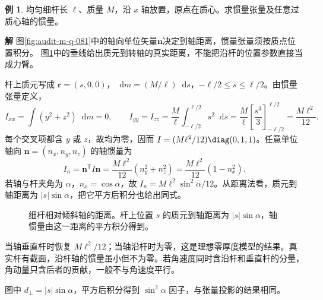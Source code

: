 \documentclass[11pt,openany,fontset=fandol]{ctexbook}
\theoremstyle{plain}\newtheorem{theorem}{定理}[chapter]\newtheorem{proposition}[theorem]{命题}
\theoremstyle{definition}\newtheorem{definition}{定义}[chapter]\newtheorem{example}{例}[chapter]
\theoremstyle{remark}\newtheorem*{remark}{说明}
\newcommand{\SolutionStart}{\par\nobreak\medskip\nobreak\noindent\textbf{解}\quad\ignorespaces}
\newenvironment{solution}{\SolutionStart}{\par\medskip}
\newcommand{\dd}{\mathop{}\!\mathrm d}\newcommand{\ii}{\mathrm i}\newcommand{\ee}{\mathrm e}
\newcommand{\vct}[1]{\bm{#1}}\newcommand{\Rea}{\operatorname{Re}}\newcommand{\Ima}{\operatorname{Im}}
\begin{document}
\begin{example}
均匀细杆长 $\ell$、质量 $M$，沿 $x$ 轴放置，原点在质心。求惯量张量及任意过质心轴的惯量。
\end{example}

\begin{solution}
图\ref{fig:audit-m-q-081}中的轴向单位矢量$\vct n$决定到轴距离，惯量张量须按质点位置积分。
图\ref{fig:orig-068}中的垂线给出质元到转轴的真实距离，不能把沿杆的位置参数直接当成力臂。

杆上质元写成 $\vct r=(s,0,0)$，$\dd m=(M/\ell)\dd s$，$-\ell/2\le s\le\ell/2$。由惯量张量定义，
\[
I_{xx}=\int(y^2+z^2)\dd m=0,\qquad
I_{yy}=I_{zz}=\frac M\ell\int_{-\ell/2}^{\ell/2}s^2\dd s
=\frac M\ell\left[\frac{s^3}{3}\right]_{-\ell/2}^{\ell/2}
=\frac{M\ell^2}{12}.
\]
每个交叉项都含 $y$ 或 $z$，故均为零，因而 $I=(M\ell^2/12)\diag(0,1,1)$。任意单位轴向 $\vct n=(n_x,n_y,n_z)$ 的轴惯量为
\[
I_n=\vct n^{\mathsf T}I\vct n
=\frac{M\ell^2}{12}(n_y^2+n_z^2)
=\frac{M\ell^2}{12}(1-n_x^2).
\]
若轴与杆夹角为 $\alpha$，$n_x=\cos\alpha$，故 $I_n=M\ell^2\sin^2\alpha/12$。从距离法看，质元到轴距离为 $|s|\sin\alpha$，把它平方后积分也给出同式。

\begin{figure}[H]\centering
{}
\caption{细杆相对倾斜轴的距离。杆上位置 $s$ 的质元到轴距离为 $|s|\sin\alpha$，轴惯量由这一距离的平方积分得到。}
\label{fig:orig-068}
\end{figure}

当轴垂直杆时恢复 $M\ell^2/12$；当轴沿杆时为零，这是理想零厚度模型的结果。真实杆有截面，沿杆轴的惯量虽小但不为零。若角速度同时含沿杆和垂直杆的分量，角动量只含后者的贡献，一般不与角速度平行。

图中 $d_\perp=|s|\sin\alpha$，平方后积分得到 $\sin^2\alpha$ 因子，与张量投影的结果相同。
\end{solution}
\end{document}
